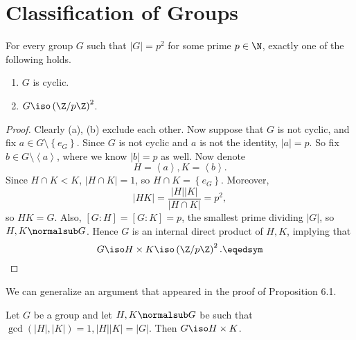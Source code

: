 \documentclass[pmath347]{subfiles}
\begin{document}

    \section{Classification of Groups}
    
    \begin{prop}{}
        For every group $G$ such that $\left| G \right| = p^{2}$ for some prime $p\in\N$, exactly one of the following holds.
        \begin{enumerate}
            \item $G$ is cyclic.
            \item $G\iso \left( \Z /p\Z \right) ^{2} $.
        \end{enumerate}
    \end{prop}

    \begin{proof}
        Clearly (a), (b) exclude each other. Now suppose that $G$ is not cyclic, and fix $a\in G\setminus \left\lbrace e_G \right\rbrace$. Since $G$ is not cyclic and $a$ is not the identity, $\left| a \right| = p$. So fix $b\in G\setminus \left< a \right>$, where we know $\left| b \right| = p$ as well. Now denote
        \begin{equation*}
            H = \left< a \right> , K = \left< b \right> .  
        \end{equation*}
        Since $H\cap K<K$, $\left| H\cap K \right| = 1$, so $H\cap K = \left\lbrace e_G \right\rbrace$. Moreover,
        \begin{equation*}
            \left| HK \right| = \frac{\left| H \right| \left| K \right| }{\left| H\cap K \right| } = p^{2} ,
        \end{equation*}
        so $HK=G$. Also, $\left[ G:H \right] = \left[ G:K \right] = p$, the smallest prime dividing $\left| G \right|$, so $H,K\normalsub G$. Hence $G$ is an internal direct product of $H, K$, implying that
        \begin{equation*}
            G\iso H\times K\iso \left( \Z /p\Z \right) ^{2} .\eqedsym
        \end{equation*}
    \end{proof}

    \np We can generalize an argument that appeared in the proof of Proposition 6.1.

    \begin{prop}{}
        Let $G$ be a group and let $H,K\normalsub G$ be such that $\gcd\left( \left| H \right| , \left| K \right|  \right) = 1, \left| H \right| \left| K \right| = \left| G \right|$. Then $G\iso H\times K$.
    \end{prop}
\end{document}
